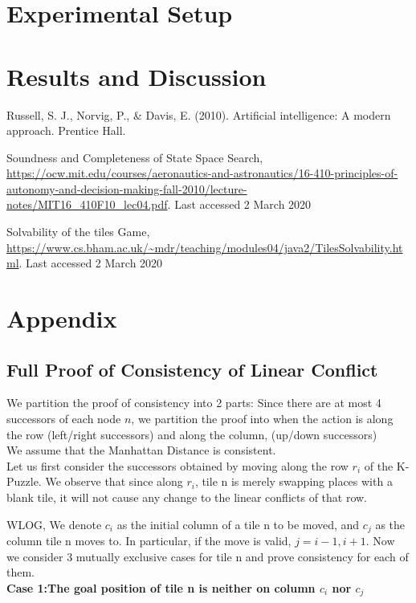 \documentclass{llncs}
\begin{document}
\section{Experimental Setup}
\section{Results and Discussion}
\newpage

\begin{thebibliography}{8}
Russell, S. J., Norvig, P., \& Davis, E. (2010). Artificial intelligence: A modern approach. Prentice Hall.

Soundness and Completeness of State Space Search, \url{https://ocw.mit.edu/courses/aeronautics-and-astronautics/16-410-principles-of-autonomy-and-decision-making-fall-2010/lecture-notes/MIT16\_410F10\_lec04.pdf}. Last accessed 2 March 2020

Solvability of the tiles Game,  \url{https://www.cs.bham.ac.uk/~mdr/teaching/modules04/java2/TilesSolvability.html}. 
Last accessed 2 March 2020
\end{thebibliography}
\newpage
\section{Appendix}

\subsection{Full Proof of Consistency of Linear Conflict}

We partition the proof of consistency into 2 parts:
Since there are at most 4 successors of each node $n$, we partition the proof into when the action is along the row (left/right successors) and along the column, (up/down successors) \\
We assume that the Manhattan Distance is consistent.\\

Let us first consider the successors obtained by moving along the row $r_i$ of the K-Puzzle. We observe that since along $r_i$, tile n is merely swapping places with a
blank tile, it will not cause any change to the linear conflicts of that row.

WLOG, We denote $c_i$ as the initial column of a tile n to be moved, and $c_j$ as the column tile n moves to. In particular, if the move is valid, $j= i-1, i+1$.
Now we consider 3 mutually exclusive cases for tile n and prove consistency for each of them.
\\
\textbf{Case 1:The goal position of tile n is neither on column $c_i$ nor $c_j$}
\end{document}
